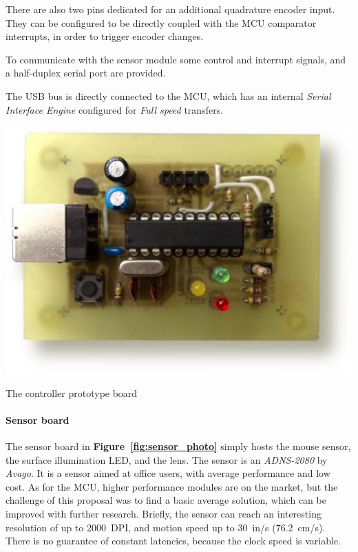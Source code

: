 \documentclass[a4paper,10pt]{article}
\makeatletter
\newenvironment{figurehere}{\def\@captype{figure}\vspace{2ex}}{\vspace{2ex}}
\newcommand{\citef}[1]{\textbf{Figure~\ref{#1}}}
\makeatother
\begin{document}
\begin{multicols}{2}
There are also two pins dedicated for an additional quadrature encoder input.
They can be configured to be directly coupled with the MCU comparator
interrupts, in order to trigger encoder changes.

To communicate with the sensor module some control and interrupt signals, and
a half-duplex serial port are provided.

The USB bus is directly connected to the MCU, which has an internal
\emph{Serial Interface Engine} configured for \emph{Full speed} transfers.

\begin{figurehere}
	\centering
	\includegraphics[keepaspectratio=true,width=\columnwidth]{images/board_photo.pdf}
	\caption{The controller prototype board}
	\label{fig:board_photo}
\end{figurehere}


\paragraph{Sensor board}
The sensor board in \citef{fig:sensor_photo} simply hosts the mouse sensor,
the surface illumination LED, and the lens. The sensor is an \emph{ADNS-2080}
\cite{avago_adns2080} by \emph{Avago}. It is a sensor aimed at office users,
with average performance and low cost. As for the MCU, higher performance
modules are on the market, but the challenge of this proposal was to find a
basic average solution, which can be improved with further research. Briefly,
the sensor can reach an interesting resolution of up to 2000~DPI, and motion
speed up to 30~in/s (76.2~cm/s). There is no guarantee of constant latencies,
because the clock speed is variable.


\end{multicols}
\end{document}

